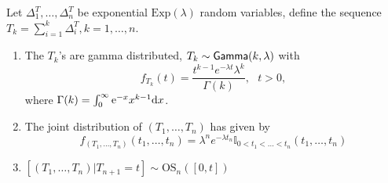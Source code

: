 \begin{prop}\label{prop:erlang_dist}
Let $\Delta^T_1,\ldots, \Delta^T_n$ be \iid exponential $\text{Exp}(\lambda)$ random variables, define the sequence $T_k=\sum_{i=1}^{k}\Delta^T_i, k=1,\ldots, n$.
\begin{enumerate}
\item The $T_{k}$'s are gamma distributed, $T_{k}\sim\mathsf{Gamma}(k,\lambda)$ with \pdf 
$$
f_{T_k}(t)=\frac{t^{k-1}e^{-\lambda t}\lambda^k}{\Gamma(k)},\text{ }t>0,
$$
where $\Gamma(k) = \int_{0}^{\infty}\mathrm{e}^{- x}x^{k-1}\text{d}x$.
\item The joint distribution of $(T_1,\ldots, T_n)$ has \pmf given by
$$
f_{(T_1,\ldots, T_n)}(t_1,\ldots, t_n)=\lambda^n e^{-\lambda t_n }\mathbb{I}_{0<t_1<\ldots< t_n}(t_1,\ldots, t_n)
$$
\item $[(T_1,\ldots, T_n)|T_{n+1}=t]\sim \text{OS}_{n}([0,t])$
\end{enumerate}
\end{prop}
